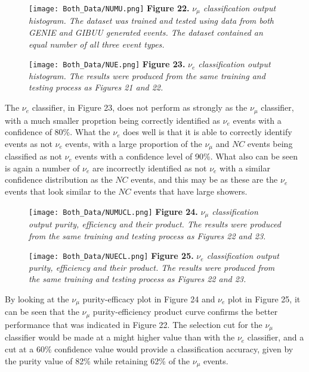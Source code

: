 \begin{figure}[t!]
 \centering
 \texttt{[image: Both\_Data/NUMU.png]}
 \textbf{Figure 22.} \textit{$\nu_\mu$ classification output histogram. The dataset was trained and tested using data from both GENIE and GIBUU generated events. The dataset contained an equal number of all three event types.}

 \texttt{[image: Both\_Data/NUE.png]}
 \textbf{Figure 23.} \textit{$\nu_e$ classification output histogram. The results were produced from the same training and testing process as Figures 21 and 22.}
\end{figure}

\noindent The $\nu_e$ classifier, in Figure 23, does not perform as strongly as the $\nu_\mu$ classifier, with a much smaller proprtion being correctly identified as $\nu_e$ events with a confidence of 80\%. What the $\nu_e$ does well is that it is able to correctly identify events as not $\nu_e$ events, with a large proportion of the $\nu_\mu$ and $NC$ events being classified as not $\nu_e$ events with a confidence level of 90\%. What also can be seen is again a number of $\nu_e$ are incorrectly identified as not $\nu_e$ with a similar confidence distribution as the $NC$ events, and this may be as these are the $\nu_e$ events that look similar to the $NC$ events that have large showers. \medskip

\begin{figure}[t!]
 \centering
 \texttt{[image: Both\_Data/NUMUCL.png]}
 \textbf{Figure 24.} \textit{$\nu_\mu$ classification output purity, efficiency and their product. The results were produced from the same training and testing process as Figures 22 and 23.}
 
 \texttt{[image: Both\_Data/NUECL.png]}
 \textbf{Figure 25.} \textit{$\nu_e$ classification output purity, efficiency and their product. The results were produced from the same training and testing process as Figures 22 and 23.}
\end{figure}


\noindent By looking at the $\nu_\mu$ purity-efficacy plot in Figure 24 and $\nu_e$ plot in Figure 25, it can be seen that the $\nu_\mu$ purity-efficiency product curve confirms the better performance that was indicated in Figure 22. The selection cut for the $\nu_\mu$ classifier would be made at a might higher value than with the $\nu_e$ classifier, and a cut at a 60\% confidence value would provide a classification accuracy, given by the purity value of 82\% while retaining 62\% of the $\nu_\mu$ events. \medskip

